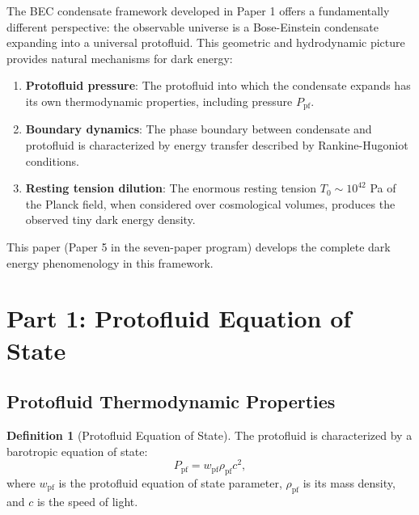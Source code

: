 \documentclass[11pt,a4paper]{article}
\newcommand{\Tzero}{\ensuremath{T_0}}
\newcommand{\wpf}{\ensuremath{w_{\mathrm{pf}}}}
\newcommand{\Ppf}{\ensuremath{P_{\mathrm{pf}}}}
\newcommand{\rhopf}{\ensuremath{\rho_{\mathrm{pf}}}}
\theoremstyle{definition}
\newtheorem{definition}[theorem]{Definition}
\theoremstyle{remark}
\begin{document}
The BEC condensate framework developed in Paper 1 \cite{SkavbergPaper1} offers a fundamentally different perspective: the observable universe is a Bose-Einstein condensate expanding into a universal protofluid. This geometric and hydrodynamic picture provides natural mechanisms for dark energy:

\begin{enumerate}[leftmargin=*, itemsep=0.3em]
\item \textbf{Protofluid pressure}: The protofluid into which the condensate expands has its own thermodynamic properties, including pressure $\Ppf$.

\item \textbf{Boundary dynamics}: The phase boundary between condensate and protofluid is characterized by energy transfer described by Rankine-Hugoniot conditions.

\item \textbf{Resting tension dilution}: The enormous resting tension $\Tzero \sim 10^{42}$ Pa of the Planck field, when considered over cosmological volumes, produces the observed tiny dark energy density.
\end{enumerate}

This paper (Paper 5 in the seven-paper program) develops the complete dark energy phenomenology in this framework.

\section{Part 1: Protofluid Equation of State}
\label{sec:protofluid_eos}

\subsection{Protofluid Thermodynamic Properties}
\label{sec:protofluid_thermo}

\begin{definition}[Protofluid Equation of State]
\label{def:protofluid_eos}
The protofluid is characterized by a barotropic equation of state:
\begin{equation}
\label{eq:protofluid_eos}
\boxed{\Ppf = \wpf \rhopf c^2,}
\end{equation}
where $\wpf$ is the protofluid equation of state parameter, $\rhopf$ is its mass density, and $c$ is the speed of light.
\end{definition}
\end{document}
